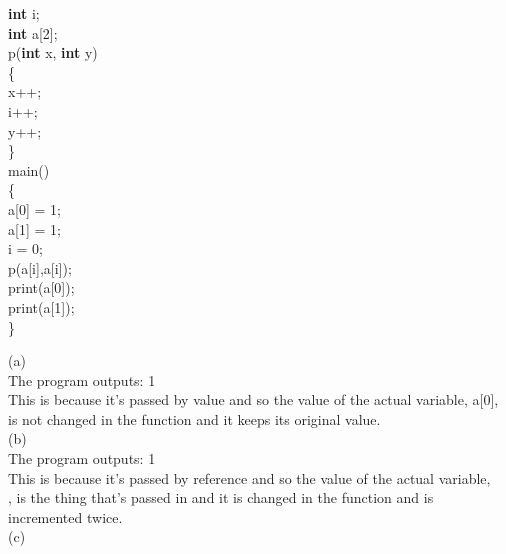\documentclass[12pt]{article}
\begin{document}
\begin{flushleft}
{\qquad \textbf{int} i;\\
\qquad \textbf{int} a[2];\\
[2mm]
\qquad p(\textbf{int} x, \textbf{int} y)\\
\qquad \{\\
\qquad \qquad 	x++;\\
\qquad \qquad 	i++;\\
\qquad \qquad 	y++;\\
\qquad \}\\
[2mm]
\qquad main()\\
\qquad \{\\
\qquad \qquad 	a[0] = 1;\\
\qquad \qquad 	a[1] = 1;\\
\qquad \qquad 	i = 0;\\
\qquad \qquad 	p(a[i],a[i]);\\
\qquad \qquad 	print(a[0]);\\
\qquad \qquad 	print(a[1]);\\
\qquad \}\\
[2mm]
}

\qquad \qquad \qquad (a)\\

\qquad \qquad \qquad \qquad The program outputs: { 1 }\\
[2mm] 
\qquad \qquad \qquad \qquad This is because it's passed by value and so the value of the actual variable,  {\selectfont a[0]},\\
\qquad \qquad \qquad \qquad  is not changed in the function and it keeps its original value.\\
[2mm]

\qquad \qquad \qquad (b)\\

\qquad \qquad \qquad \qquad The program outputs: { 1 }\\
[2mm] 
\qquad \qquad \qquad \qquad This is because it's passed by reference and so the value of the actual variable,\\
\qquad \qquad \qquad {}, is the thing that's passed in and it is changed in the function and is\\
\qquad \qquad \qquad \qquad incremented twice.\\
[2mm]

\qquad \qquad \qquad (c)\\


\end{flushleft}
\end{document}
